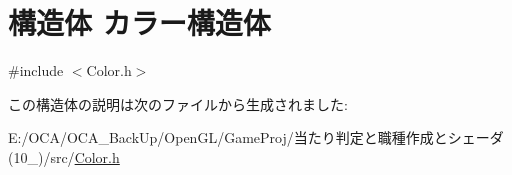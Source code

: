 \hypertarget{struct_xE3_x82_xAB_xE3_x83_xA9_xE3_x83_xBC_xE6_xA7_x8B_xE9_x80_xA0_xE4_xBD_x93}{\section{構造体 カラー構造体}
\label{struct_xE3_x82_xAB_xE3_x83_xA9_xE3_x83_xBC_xE6_xA7_x8B_xE9_x80_xA0_xE4_xBD_x93}
}


{\ttfamily \#include $<$Color.\-h$>$}



この構造体の説明は次のファイルから生成されました\-:\begin{DoxyCompactItemize}
\item 
E\-:/\-O\-C\-A/\-O\-C\-A\-\_\-\-Back\-Up/\-Open\-G\-L/\-Game\-Proj/当たり判定と職種作成とシェーダ(10\-\_)/src/\hyperlink{_color_8h}{Color.\-h}\end{DoxyCompactItemize}
